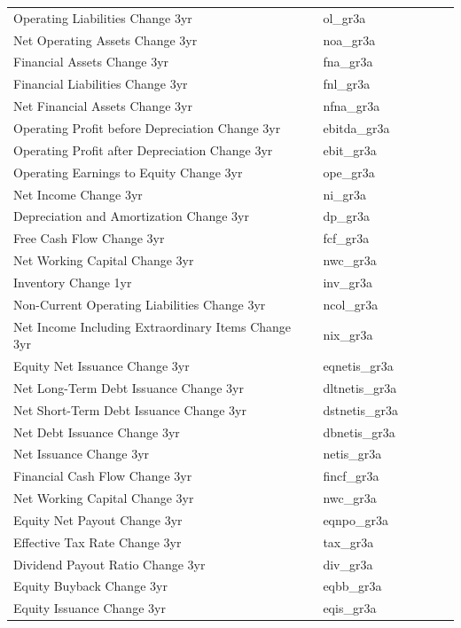 \documentclass[12pt,title,fleqn]{article}
\begin{document}
\begin{longtable}{p{5cm}p{2cm}p{5cm}lll}
Operating Liabilities Change 3yr & ol\_gr3a & & & & \\
Net Operating Assets Change 3yr & noa\_gr3a & & & & \\
Financial Assets Change 3yr & fna\_gr3a & & & & \\
Financial Liabilities Change 3yr & fnl\_gr3a & & & & \\
Net Financial Assets Change 3yr & nfna\_gr3a & & & & \\
Operating Profit before Depreciation Change 3yr & ebitda\_gr3a & & & & \\
Operating Profit after Depreciation Change 3yr & ebit\_gr3a & & & & \\
Operating Earnings to Equity Change 3yr & ope\_gr3a & & & & \\
Net Income Change 3yr & ni\_gr3a & & & & \\
Depreciation and Amortization Change 3yr & dp\_gr3a & & & & \\
Free Cash Flow Change 3yr & fcf\_gr3a & & & & \\
Net Working Capital Change 3yr & nwc\_gr3a & & & & \\
Inventory Change 1yr & inv\_gr3a & & & & \\
Non-Current Operating Liabilities Change 3yr & ncol\_gr3a & & & & \\
Net Income Including Extraordinary Items Change 3yr & nix\_gr3a & & & & \\
Equity Net Issuance Change 3yr & eqnetis\_gr3a & & & & \\
Net Long-Term Debt Issuance Change 3yr & dltnetis\_gr3a & & & & \\
Net Short-Term Debt Issuance Change 3yr & dstnetis\_gr3a & & & & \\
Net Debt Issuance Change 3yr & dbnetis\_gr3a & & & & \\
Net Issuance Change 3yr & netis\_gr3a & & & & \\
Financial Cash Flow Change 3yr & fincf\_gr3a & & & & \\
Net Working Capital Change 3yr & nwc\_gr3a & & & & \\
Equity Net Payout Change 3yr & eqnpo\_gr3a & & & & \\
Effective Tax Rate Change 3yr & tax\_gr3a & & & & \\
Dividend Payout Ratio Change 3yr & div\_gr3a & & & & \\
Equity Buyback Change 3yr & eqbb\_gr3a & & & & \\
Equity Issuance Change 3yr & eqis\_gr3a & & & & \\

\end{longtable}
\end{document}
